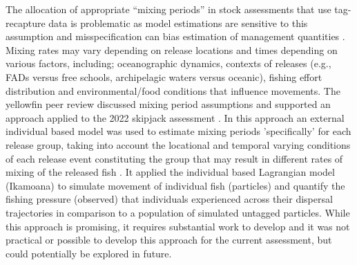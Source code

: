 The allocation of appropriate ``mixing periods'' in stock assessments that use tag-recapture data is problematic as model estimations are sensitive to this assumption and misspecification can bias estimation of management quantities \citep{kolody_evaluation_2014}. Mixing rates may vary depending on release locations and times depending on various factors, including; oceanographic dynamics,  contexts of releases (e.g., FADs versus free schools, archipelagic waters versus oceanic), fishing effort distribution and environmental/food conditions that influence movements. The yellowfin peer review discussed mixing period assumptions and supported an approach applied to the 2022 skipjack assessment \citep{castillo_jordan_stock_2022,punt_independent_2023}. In this approach an external individual based model was used to estimate mixing periods 'specifically' for each release group, taking into account the locational and temporal varying conditions of each release event constituting the group that may result in different rates of mixing of the released fish \citep{scutt_phillips_quantifying_2022}. It applied the individual based Lagrangian model (Ikamoana) \citep{scutt_phillips_individual-based_2018} to simulate movement of individual fish (particles) and quantify the fishing pressure (observed) that individuals experienced across their dispersal trajectories in comparison to a population of simulated untagged particles. While this approach is promising, it requires substantial work to develop and it was not practical or possible to develop this approach for the current assessment, but could potentially be explored in future.

